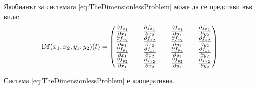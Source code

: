 
Якобианът за системата \eqref{eq:TheDimensionlessProblem} може да се представи във вида:
\begin{equation}
  \mathrm{D} \mathbf{f}(x_1, x_2, y_1, y_2)(t) =
  \begin{pmatrix}
    \pdv{f_{x_1}}{x_1} && \pdv{f_{x_1}}{x_2} && \pdv{f_{x_1}}{y_1} && \pdv{f_{x_1}}{y_2} \\
    \pdv{f_{x_2}}{x_1} && \pdv{f_{x_2}}{x_2} && \pdv{f_{x_2}}{y_1} && \pdv{f_{x_2}}{y_2} \\
    \pdv{f_{y_1}}{x_1} && \pdv{f_{y_1}}{x_2} && \pdv{f_{y_1}}{y_1} && \pdv{f_{y_1}}{y_2} \\
    \pdv{f_{y_2}}{x_1} && \pdv{f_{y_2}}{x_2} && \pdv{f_{y_2}}{y_1} && \pdv{f_{y_2}}{y_2}
  \end{pmatrix}
  \end{equation}

\begin{proposition}
  \label{prop:Cooperative}
  Система \eqref{eq:TheDimensionlessProblem} е кооперативна.
\end{proposition}


